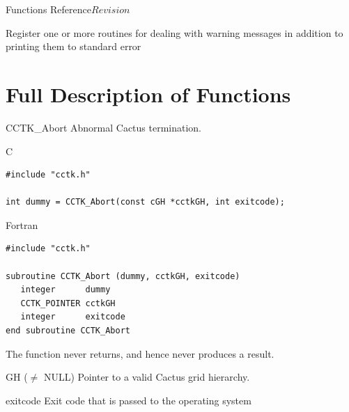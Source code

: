 \begin{cactuspart}{ Functions Reference}{}{$Revision$}
\begin{Lentry}
\item[\code{CCTK\_WarnCallbackRegister}] [\pageref{CCTK-WARNCallbackRegister}]
  Register one or more routines for dealing with warning messages in addition
  to printing them to standard error

\end{Lentry}


\chapter{Full Description of Functions}


\begin{FunctionDescription}{CCTK\_Abort}
\label{CCTK-Abort}
Abnormal Cactus termination.

\begin{SynopsisSection}
\begin{Synopsis}{C}
\begin{verbatim}
#include "cctk.h"

int dummy = CCTK_Abort(const cGH *cctkGH, int exitcode);
\end{verbatim}
\end{Synopsis}
\begin{Synopsis}{Fortran}
\begin{verbatim}
#include "cctk.h"

subroutine CCTK_Abort (dummy, cctkGH, exitcode)
   integer      dummy
   CCTK_POINTER cctkGH
   integer      exitcode
end subroutine CCTK_Abort
\end{verbatim}
\end{Synopsis}
\end{SynopsisSection}

\begin{ResultSection}
\begin{Result}{}
The function never returns, and hence never produces a result.
\end{Result}
\end{ResultSection}

\begin{ParameterSection}
\begin{Parameter}{GH ($\ne$ NULL)}
Pointer to a valid Cactus grid hierarchy.
\end{Parameter}
\begin{Parameter}{exitcode}
Exit code that is passed to the operating system
\end{Parameter}
\end{ParameterSection}


\end{FunctionDescription}
\end{cactuspart}
